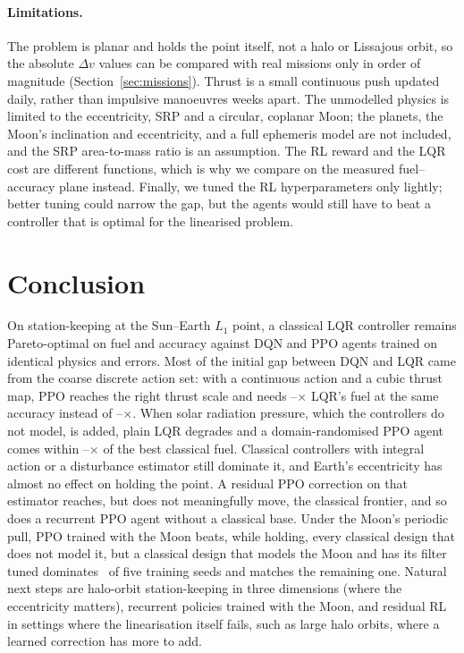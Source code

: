 \documentclass[11pt,a4paper]{article}
\newcommand{\dv}{\Delta v}
\begin{document}
\paragraph{Limitations.}
\label{sec:limits}
The problem is planar and holds the point itself, not a halo or Lissajous
orbit, so the absolute $\dv$ values can be compared with real missions only in
order of magnitude (Section~\ref{sec:missions}).
Thrust is a small continuous push updated daily, rather than impulsive
manoeuvres weeks apart. The unmodelled physics
is limited to the eccentricity, SRP and a circular, coplanar Moon; the
planets, the Moon's inclination and eccentricity, and a full ephemeris model
are not included, and the SRP area-to-mass ratio is an assumption. The RL reward and the LQR cost are different
functions, which is why we compare on the measured fuel--accuracy plane
instead. Finally, we tuned the RL hyperparameters only lightly; better tuning
could narrow the gap, but the agents would still have to beat a controller that
is optimal for the linearised problem.

\section{Conclusion}

On station-keeping at the Sun--Earth $L_1$ point, a classical LQR controller
remains Pareto-optimal on fuel and accuracy against DQN and PPO agents trained
on identical physics and errors. Most of the initial gap between DQN and LQR
came from the coarse discrete action set: with a continuous action and a cubic
thrust map, PPO reaches the right thrust scale and needs
\cubRatioMin--\cubRatioMax$\times$ LQR's fuel at the same accuracy instead of
\dqnRatioMin--\dqnRatioMax$\times$. When solar radiation pressure, which the
controllers do not model, is added, plain LQR degrades and a domain-randomised
PPO agent comes within \mmDrHoldMin--\mmDrHoldMax$\times$ of the best classical
fuel. Classical controllers with integral action or a disturbance estimator
still dominate it, and Earth's eccentricity has almost no effect on holding the
point. A residual PPO correction on that estimator reaches, but does not
meaningfully move, the classical frontier, and so does a recurrent PPO agent
without a classical base. Under the Moon's periodic pull,
PPO trained with the Moon beats, while holding, every classical design that
does not model it, but a classical design that models the Moon and has its
filter tuned dominates \kThreeFreshDomWord\ of five training seeds and matches
the remaining one.
Natural next steps are halo-orbit
station-keeping in three dimensions (where the eccentricity matters),
recurrent policies trained with the Moon, and residual RL in settings where
the linearisation itself fails, such as large halo orbits, where a learned
correction has more to add.
\end{document}
